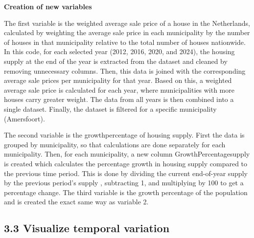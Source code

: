 \documentclass[
]{article}
\begin{document}
\textbf{Creation of new variables}

The first variable is the weighted average sale price of a house in the
Netherlands, calculated by weighting the average sale price in each
municipality by the number of houses in that municipality relative to
the total number of houses nationwide. In this code, for each selected
year (2012, 2016, 2020, and 2024), the housing supply at the end of the
year is extracted from the dataset and cleaned by removing unnecessary
columns. Then, this data is joined with the corresponding average sale
prices per municipality for that year. Based on this, a weighted average
sale price is calculated for each year, where municipalities with more
houses carry greater weight. The data from all years is then combined
into a single dataset. Finally, the dataset is filtered for a specific
municipality (Amersfoort).

The second variable is the growthpercentage of housing supply. First the
data is grouped by municipality, so that calculations are done
separately for each municipality. Then, for each municipality, a new
column GrowthPercentagesupply is created which calculates the percentage
growth in housing supply compared to the previous time period. This is
done by dividing the current end-of-year supply by the previous period's
supply , subtracting 1, and multiplying by 100 to get a percentage
change. The third variable is the growth percentage of the population
and is created the exact same way as variable 2.

\subsection{3.3 Visualize temporal
variation}\label{visualize-temporal-variation}
\end{document}
